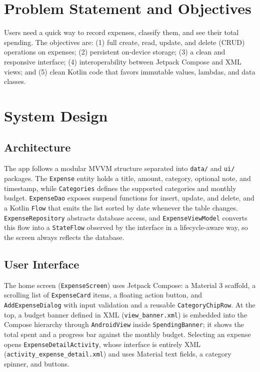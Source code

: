 \documentclass[sigconf,nonacm]{acmart}
\begin{document}
\section{Problem Statement and Objectives}
Users need a quick way to record expenses, classify them, and see their total spending. The
objectives are: (1) full create, read, update, and delete (CRUD) operations on expenses;
(2) persistent on-device storage; (3) a clean and responsive interface; (4) interoperability
between Jetpack Compose and XML views; and (5) clean Kotlin code that favors immutable values,
lambdas, and data classes.

\section{System Design}
\subsection{Architecture}
The app follows a modular MVVM structure separated into \texttt{data/} and \texttt{ui/} packages.
The \texttt{Expense} entity holds a title, amount, category, optional note, and timestamp, while
\texttt{Categories} defines the supported categories and monthly budget. \texttt{ExpenseDao}
exposes suspend functions for insert, update, and delete, and a Kotlin \texttt{Flow} that emits
the list sorted by date whenever the table changes. \texttt{ExpenseRepository} abstracts database
access, and \texttt{ExpenseViewModel} converts this flow into a \texttt{StateFlow} observed by
the interface in a lifecycle-aware way, so the screen always reflects the database.

\subsection{User Interface}
The home screen (\texttt{ExpenseScreen}) uses Jetpack Compose: a Material 3 scaffold, a scrolling
list of \texttt{ExpenseCard} items, a floating action button, and \texttt{AddExpenseDialog} with
input validation and a reusable \texttt{CategoryChipRow}. At the top, a budget banner defined in
XML (\texttt{view\_banner.xml}) is embedded into the Compose hierarchy through \texttt{AndroidView}
inside \texttt{SpendingBanner}; it shows the total spent and a progress bar against the monthly
budget. Selecting an expense opens \texttt{ExpenseDetailActivity}, whose interface is entirely
XML (\texttt{activity\_expense\_detail.xml}) and uses Material text fields, a category spinner,
and buttons.
\end{document}
